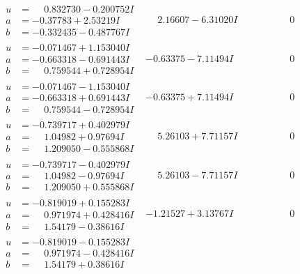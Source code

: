 \documentclass[1p]{elsarticle_modified}
\theoremstyle{definition}
\begin{document}
$$\begin{array}{c|c|c}
\begin{aligned}
u &= \phantom{-}0.832730 - 0.200752 I \\
a &= -0.37783 + 2.53219 I \\
b &= -0.332435 - 0.487767 I\end{aligned}
 & \phantom{-}2.16607 - 6.31020 I & \phantom{-0.000000 } 0 \\ \hline\begin{aligned}
u &= -0.071467 + 1.153040 I \\
a &= -0.663318 - 0.691443 I \\
b &= \phantom{-}0.759544 + 0.728954 I\end{aligned}
 & -0.63375 - 7.11494 I & \phantom{-0.000000 } 0 \\ \hline\begin{aligned}
u &= -0.071467 - 1.153040 I \\
a &= -0.663318 + 0.691443 I \\
b &= \phantom{-}0.759544 - 0.728954 I\end{aligned}
 & -0.63375 + 7.11494 I & \phantom{-0.000000 } 0 \\ \hline\begin{aligned}
u &= -0.739717 + 0.402979 I \\
a &= \phantom{-}1.04982 + 0.97694 I \\
b &= \phantom{-}1.209050 - 0.555868 I\end{aligned}
 & \phantom{-}5.26103 + 7.71157 I & \phantom{-0.000000 } 0 \\ \hline\begin{aligned}
u &= -0.739717 - 0.402979 I \\
a &= \phantom{-}1.04982 - 0.97694 I \\
b &= \phantom{-}1.209050 + 0.555868 I\end{aligned}
 & \phantom{-}5.26103 - 7.71157 I & \phantom{-0.000000 } 0 \\ \hline\begin{aligned}
u &= -0.819019 + 0.155283 I \\
a &= \phantom{-}0.971974 + 0.428416 I \\
b &= \phantom{-}1.54179 - 0.38616 I\end{aligned}
 & -1.21527 + 3.13767 I & \phantom{-0.000000 } 0 \\ \hline\begin{aligned}
u &= -0.819019 - 0.155283 I \\
a &= \phantom{-}0.971974 - 0.428416 I \\
b &= \phantom{-}1.54179 + 0.38616 I\end{aligned}

\end{array}$$
\end{document}
